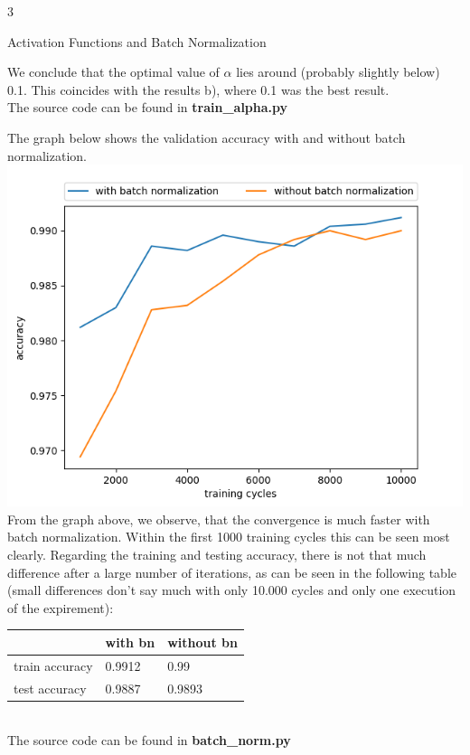\documentclass{article}
\begin{document}
\begin{ukon-infie}[24.12.17]{3}
\begin{exercise}[p=40+20]{Activation Functions and Batch Normalization}
{			We conclude that the optimal value of $\alpha$ lies around (probably slightly below) 0.1. This coincides with the results b), where 0.1 was the best result.\\
			The source code can be found in \textbf{train\_alpha.py}

		}
		\question{}
		{
			The graph below shows the validation accuracy with and without batch normalization.\\
			\includegraphics[scale=0.6]{with_vs_without_bn.png}\\
			From the graph above, we observe, that the convergence is much faster with batch normalization. Within the first 1000 training cycles this can be seen most clearly. Regarding the training and testing accuracy, there is not that much difference after a large number of iterations, as can be seen in the following table (small differences don't say much with only 10.000 cycles and only one execution of the expirement):\\
		\begin{tabular}{|l|l|l|}
\hline
               & with bn & without bn \\ \hline
train accuracy & 0.9912  & 0.99       \\ \hline
test accuracy  & 0.9887  & 0.9893     \\ \hline
\end{tabular}\\

The source code can be found in \textbf{batch\_norm.py}

		}
		

\end{exercise}
\end{ukon-infie}
\end{document}
